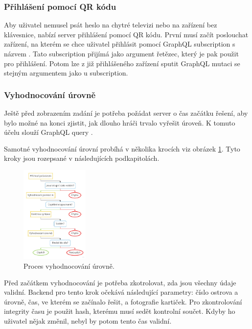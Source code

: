 \subsubsection{Přihlášení pomocí QR kódu}
Aby uživatel nemusel psát heslo na chytré televizi nebo na zařízení bez klávesnice, nabízí server přihlášení pomocí QR kódu. První musí začít poslouchat zařízení, na kterém se chce uživatel přihlásit pomocí GraphQL subscription s názvem . Tato subscription přijímá jako argument řetězec, který je pak použit pro přihlášení. Potom lze z již přihlášeného zařízení sputit GraphQL mutaci  se stejným argumentem jako u subscription.

\subsubsection{Vyhodnocování úrovně}
Ještě před zobrazením zadání je potřeba požádat server o čas začátku řešení, aby bylo možné na konci zjistit, jak dlouho hráči trvalo vyřešit úroveň. K tomuto účelu slouží GraphQL query .\par
Samotné vyhodnocování úrovní probíhá v několika krocích viz obrázek \ref{fig:proces-vyhodnocovani}. Tyto kroky jsou rozepsané v následujících podkapitolách.

\begin{figure}[h]
    \centering
    \includegraphics[width=0.3\textwidth]{img/proces.jpg}
    \caption{Proces vyhodnocování úrovně.}
    \label{fig:proces-vyhodnocovani}
\end{figure}

Před začátkem vyhodnocování je potřeba zkotrolovat, zda jsou všechny údaje validní. Backend pro tento krok očekává následující parametry: číslo ostrova a úrovně, čas, ve kterém se začínalo řešit, a fotografie kartiček. Pro zkontrolování integrity času je použit hash, kterému musí sedět kontrolní součet. Kdyby ho uživatel nějak změnil, nebyl by potom tento čas validní.

